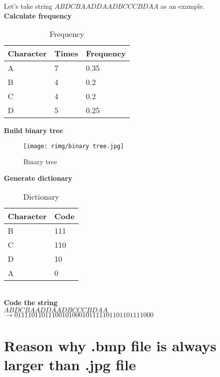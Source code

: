 \documentclass{article}
\begin{document}
\cite{ref6}


Let's take string $ABDCB AADDA ADBCC CBDAA$ as an example. \\
\textbf{Calculate frequency} \\
\begin{table}[h]
\begin{tabular}{|l|l|l|}
\hline
Character & Times & Frequency \\ \hline
A         & 7     & 0.35      \\ \hline
B         & 4     & 0.2       \\ \hline
C         & 4     & 0.2       \\ \hline
D         & 5     & 0.25      \\ \hline
\end{tabular}
\caption{Frequency}
\end{table}

\textbf{Build binary tree} \\


 \begin{figure}[h]
    \small
     \centering
    \texttt{[image: rimg/binary tree.jpg]}
     \caption{Binary tree}

 \end{figure}

\textbf{Generate dictionary} \\
\begin{table}[h]
\begin{tabular}{|l|l|}
\hline
Character & Code \\ \hline
B         & 111  \\ \hline
C         & 110  \\ \hline
D         & 10   \\ \hline
A         & 0    \\ \hline
\end{tabular}
\caption{Dictionary}
\end{table}
\\

\textbf{Code the string} \\
$ABDCB AADDA ADBCC CBDAA$ \\
$\to 011110110111 0010100 010111110110 1101111000$



\newpage
\section{Reason why .bmp file is always larger than .jpg file}
\end{document}
